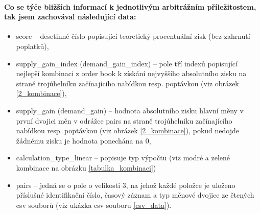 \documentclass[thesis=B,czech]{FITthesis}[2019/03/21]
\begin{document}
\paragraph{
Co se týče bližších informací k jednotlivým arbitrážním příležitostem, tak jsem zachovával následující data:
}
\begin{itemize}
    \item score -- desetinné číslo popisující teoretický procentuální zisk (bez zahrnutí poplatků),
    \item supply\_gain\_index (demand\_gain\_index) -- pole tří indexů popisující nejlepší kombinaci z order book k získání nejvyššího absolutního zisku na straně trojúhelníku začínajícího nabídkou resp. poptávkou (viz obrázek \ref{2_kombinace}),
    \item supply\_gain (demand\_gain) -- hodnota absolutního zisku hlavní měny v první dvojici měn v odrážce pairs na straně trojúhelníku začínajícího nabídkou resp. poptávkou (viz obrázek \ref{2_kombinace}), pokud nedojde žádnému zisku je hodnota ponechána na 0,
    \item calculation\_type\_linear -- popisuje typ výpočtu (viz modré a zelené kombinace na obrázku \ref{tabulka_kombinaci})
    \item pairs -- jedná se o pole o velikosti 3, na jehož každé položce je uloženo příslušné identifikační číslo, časový záznam a typ měnové dvojice ze čtených csv souborů (viz ukázka csv souboru \ref{csv_data}).
\end{itemize}
\end{document}
